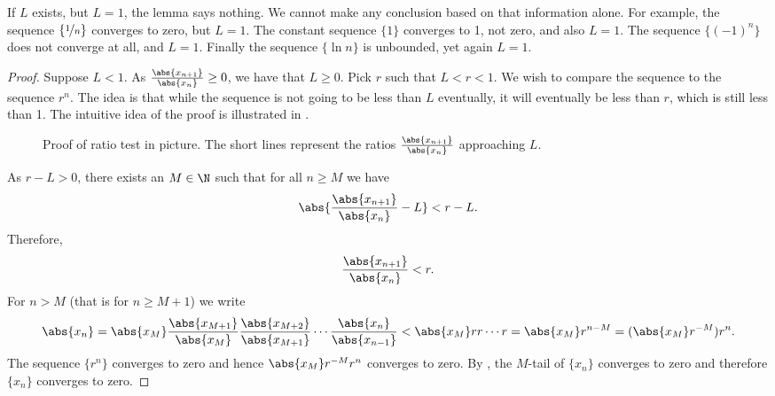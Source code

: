 \documentclass[12pt]{book}
\begin{document}
If $L$ exists, but $L=1$, the lemma says nothing.
We cannot make any
conclusion based on that information alone.
For example,
the sequence $\{ \nicefrac{1}{n} \}$ converges to zero, but $L=1$.
The constant sequence $\{ 1 \}$ converges to 1, not zero, and also
$L=1$.
The sequence $\{ {(-1)}^n \}$ does not converge at all, and $L=1$.
Finally the sequence $\{ \ln n \}$ is unbounded, yet again $L=1$.

\begin{proof}
Suppose $L < 1$.
As
$\frac{\abs{x_{n+1}}}{\abs{x_n}} \geq 0$, we have that $L \geq 0$.
Pick $r$ such that $L < r < 1$.
We wish to compare the sequence to the sequence $r^n$.
The idea is that
while the sequence is not going to be less than $L$ eventually,
it will eventually be less than $r$, which is still less than 1.
The intuitive idea of the proof is illustrated in .
\begin{figure}[h!t]
\begin{center}

\caption{Proof of ratio test in picture.
The short lines represent the
ratios 
$\frac{\abs{x_{n+1}}}{\abs{x_n}}$
approaching $L$.\label{figratseq}}
\end{center}
\end{figure}

As $r-L > 0$, there exists an $M \in \N$ such that for
all $n \geq M$ we have
\begin{equation*}
\abs{\frac{\abs{x_{n+1}}}{\abs{x_n}} - L} < r-L .
\end{equation*}
Therefore,
\begin{equation*}
\frac{\abs{x_{n+1}}}{\abs{x_n}} < r .
\end{equation*}
For $n > M$ (that is for $n \geq M+1$)
we write
\begin{equation*}
\abs{x_n} =
\abs{x_M}
\frac{\abs{x_{M+1}}}{\abs{x_{M}}}
\frac{\abs{x_{M+2}}}{\abs{x_{M+1}}}
\cdots
\frac{\abs{x_{n}}}{\abs{x_{n-1}}}
<
\abs{x_M}
r r \cdots r = \abs{x_M} r^{n-M} = (\abs{x_M} r^{-M}) r^n .
\end{equation*}
The sequence $\{ r^n \}$ converges to zero and hence 
$\abs{x_M} r^{-M} r^n$ converges to zero.
By ,
the $M$-tail of 
$\{x_n\}$ converges to zero and therefore $\{x_n\}$ converges to zero.


\end{proof}
\end{document}
